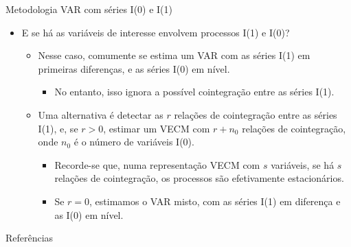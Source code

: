 \documentclass[11pt]{beamer}
\begin{document}
\begin{frame}{Metodologia VAR com séries I(0) e I(1)}
	\begin{itemize}
		\item E se há as variáveis de interesse envolvem processos I(1) e I(0)?
	\begin{itemize}
		\item Nesse caso, comumente se estima um VAR com as séries I(1) em primeiras diferenças, e as séries I(0) em nível.
		\begin{itemize}
					\item No entanto, isso ignora a possível cointegração entre as séries I(1).
		\end{itemize}
	\item Uma alternativa é detectar as $r$ relações de cointegração entre as séries I(1), e, se $r>0$, estimar um VECM com $r+n_0$ relações de cointegração, onde $n_0$ é o número de variáveis I(0).
	\begin{itemize}
		\item Recorde-se que, numa representação VECM com $s$ variáveis, se há $s$ relações de cointegração, os processos são efetivamente estacionários.
			\item Se $r=0$, estimamos o VAR misto, com as séries I(1) em diferença e as I(0) em nível.
	\end{itemize}

	
\end{itemize}
\end{itemize}
\end{frame}
\appendix
\begin{frame}[allowframebreaks]{Referências}
	\printbibliography
\end{frame}
\end{document}
